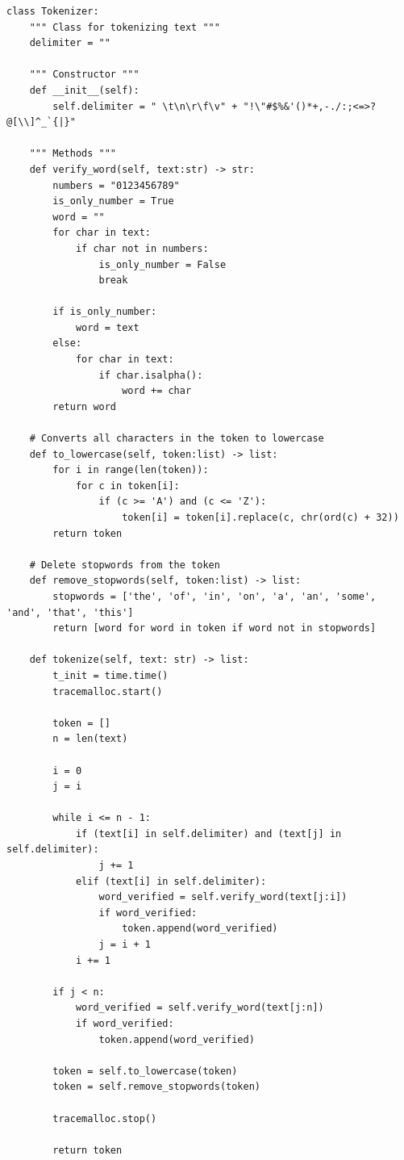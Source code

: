 \documentclass[12pt,a4paper]{article}
\begin{document}
\begin{lstlisting}[caption=Tokenizer con preprocesamiento]
class Tokenizer:
    """ Class for tokenizing text """
    delimiter = ""
    
    """ Constructor """
    def __init__(self):
        self.delimiter = " \t\n\r\f\v" + "!\"#$%&'()*+,-./:;<=>?@[\\]^_`{|}"

    """ Methods """
    def verify_word(self, text:str) -> str:
        numbers = "0123456789"
        is_only_number = True
        word = ""
        for char in text:
            if char not in numbers:
                is_only_number = False
                break 

        if is_only_number:
            word = text
        else:
            for char in text:
                if char.isalpha():
                    word += char
        return word
    
    # Converts all characters in the token to lowercase
    def to_lowercase(self, token:list) -> list:
        for i in range(len(token)):
            for c in token[i]:
                if (c >= 'A') and (c <= 'Z'):
                    token[i] = token[i].replace(c, chr(ord(c) + 32))
        return token
    
    # Delete stopwords from the token
    def remove_stopwords(self, token:list) -> list:
        stopwords = ['the', 'of', 'in', 'on', 'a', 'an', 'some', 'and', 'that', 'this']
        return [word for word in token if word not in stopwords]
        
    def tokenize(self, text: str) -> list:              
        t_init = time.time()
        tracemalloc.start()
        
        token = []
        n = len(text)
        
        i = 0
        j = i
        
        while i <= n - 1:
            if (text[i] in self.delimiter) and (text[j] in self.delimiter):
                j += 1
            elif (text[i] in self.delimiter):
                word_verified = self.verify_word(text[j:i])
                if word_verified:
                    token.append(word_verified)
                j = i + 1
            i += 1

        if j < n:
            word_verified = self.verify_word(text[j:n])
            if word_verified:
                token.append(word_verified)

        token = self.to_lowercase(token)
        token = self.remove_stopwords(token)

        tracemalloc.stop()
        
        return token
\end{lstlisting}
\end{document}
